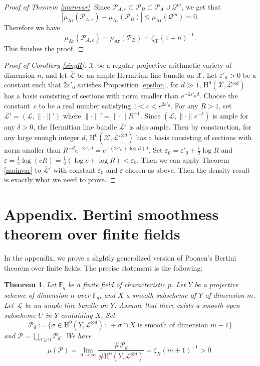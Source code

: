 \documentclass[JEP,XML,SOM,Unicode,published]{cedram}
\newcommand{\sep}{\,;\,}
\theoremstyle{plain}
\newtheorem{thm}{Theorem}[section]
\theoremstyle{definition}
\newcommand{\ho}{\mathrm{H}}
\newcommand{\X}{\mathcal{X}}
\newcommand{\Li}{\overline{\mathcal{L}}{}}
\newcommand{\li}{\mathcal{L}}
\newcommand{\F}{\mathbb{F}}
\begin{document}
\begin{proof}[Proof of Theorem \ref{mainvar}]
Since $\mathcal{P}_{A,\varepsilon}\subset \mathcal{P}_B\subset \mathcal{P}_A\cup \mathcal{Q}^m$, we get that
\[
|\mu_{\mathrm{Ar}}(\mathcal{P}_{A,\varepsilon})-\mu_{\mathrm{Ar}}(\mathcal{P}_B)|\leq \mu_{\mathrm{Ar}}(\mathcal{Q}^m)=0.
\]
Therefore we have
\[
\mu_{\mathrm{Ar}}(\mathcal{P}_{A,\varepsilon})=\mu_{\mathrm{Ar}}(\mathcal{P}_B)=\zeta_{\X}(1+n)^{-1}.
\]
This finishes the proof.
\end{proof}

\begin{proof}[Proof of Corollary \ref{singR}] $\X$ be a regular projective arithmetic variety of dimension $n$, and let $\Li$ be an ample Hermitian line bundle on $\X$. Let $\varepsilon'_0>0$ be a constant such that $2\varepsilon'_0$ satisfies Proposition \ref{epsilon}, \ie for $d\gg 1$, $\ho^0(\X, \Li^{\otimes d})$ has a basis consisting of sections with norm smaller than $e^{-2\varepsilon'_0 d}$. Choose the constant~$c$ to be a real number satisfying $1<c<e^{2\varepsilon'_0}$. For any $R>1$, set $\Li'=(\li, \lVert\cdot\rVert')$ where $\lVert\cdot\rVert'=\lVert\cdot\rVert R^{-1}$. Since $(\li, \lVert\cdot\rVert e^{-\delta})$ is ample for any $\delta>0$, the Hermitian line bundle $\Li'$ is also ample. Then by construction, for any large enough integer $d$, $\ho^0(\X, \Li'^{\otimes d})$ has a basis consisting of sections with norm smaller than $R^{-d}e^{-2\varepsilon'_0 d}=e^{-(2\varepsilon'_0+\log R)d}$. Set $\varepsilon_0=\varepsilon'_0+\frac{1}{2}\log R$ and  $\varepsilon=\frac{1}{2}\log(cR)=\frac{1}{2}(\log c+\log R)<\varepsilon_0$. Then we can apply Theorem \ref{mainvar} to $\Li'$ with constant $\varepsilon_0$ and $\varepsilon$ chosen as above. Then the density result is exactly what we need to prove.
\end{proof}

\appendix
\section*{Appendix. Bertini smoothness theorem over finite fields}\label{finitefield}

In the appendix, we prove a slightly generalized version of Poonen's Bertini theorem over finite fields. The precise statement is the following:

\begin{thm}\label{bertinifini}
Let $\F_q$ be a finite field of characteristic $p$. Let $Y$ be a projective scheme of dimension $n$ over $\F_q$, and $X$ a smooth subscheme of $Y$ of dimension $m$. Let~$\mathcal{L}$ be an ample line bundle on $Y$. Assume that there exists a smooth open subscheme $U$ in $Y$ containing $X$.
Set
\[
\mathcal{P}_{d}:=\{\sigma\in \ho^0(Y, \mathcal{L}^{\otimes d})\sep \div \sigma\cap X \text{ is smooth of dimension }m-1\}
\]
and $\mathcal{P}=\bigcup_{d\geq 0}\mathcal{P}_{d}$.
We have
\[
\mu(\mathcal{P})=\lim_{d\to \infty} \frac{ \#\mathcal{P}_{d}}{\# \ho^0(Y, \mathcal{L}^{\otimes d})}
=\zeta_X(m+1)^{-1}>0.
\]
\end{thm}
\end{document}
